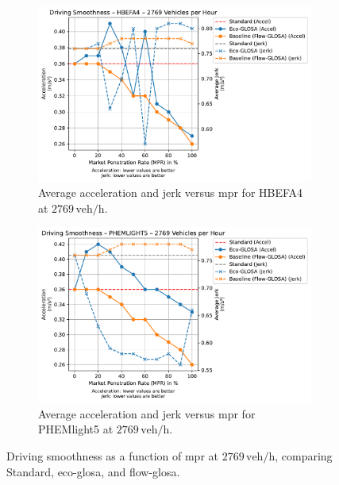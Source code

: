 \begin{figure}[htb]
  \centering
  \begin{subfigure}[b]{0.45\textwidth}
    \includegraphics[width=\textwidth]{data/img/DrivingSmoothness/DrivingSmoothness_HBEFA4_Cars2769.pdf}
    \caption{Average acceleration and jerk versus \ac{mpr} for HBEFA4 at $2769\,\mathrm{veh/h}$.}
    \label{fig:Smoothness_HBEFA4_2769}
  \end{subfigure}\hfill
  \begin{subfigure}[b]{0.45\textwidth}
    \includegraphics[width=\textwidth]{data/img/DrivingSmoothness/DrivingSmoothness_PHEMLIGHT5_Cars2769.pdf}
    \caption{Average acceleration and jerk versus \ac{mpr} for PHEMlight5 at $2769\,\mathrm{veh/h}$.}
    \label{fig:Smoothness_PHEMlight5_2769}
  \end{subfigure}
  \caption{Driving smoothness as a function of \ac{mpr} at $2769\,\mathrm{veh/h}$, comparing Standard, \ac{eco-glosa}, and \ac{flow-glosa}.}
  \label{fig:Smoothness_2769}
\end{figure}

